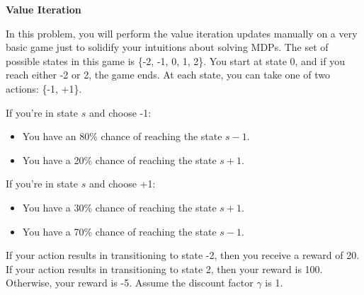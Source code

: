 \item {\bf Value Iteration}

In this problem, you will perform the value iteration updates manually on a very
basic game just to solidify your intuitions about solving MDPs. The set of
possible states in this game is \{-2, -1, 0, 1, 2\}.  You start at state 0, and
if you reach either -2 or 2, the game ends. At each state, you can take one of
two actions: \{-1, +1\}.

If you're in state $s$ and choose -1:
\begin{itemize}
  \item You have an 80\% chance of reaching the state $s-1$.
  \item You have a 20\% chance of reaching the state $s+1$.
\end{itemize}

If you're in state $s$ and choose +1:
\begin{itemize}
  \item You have a 30\% chance of reaching the state $s+1$.
  \item You have a 70\% chance of reaching the state $s-1$.
\end{itemize}

If your action results in transitioning to state -2, then you receive a reward
of 20. If your action results in transitioning to state 2, then your reward is
100. Otherwise, your reward is -5. Assume the discount factor $\gamma$ is 1.

\begin{enumerate}

  

  

\end{enumerate}
